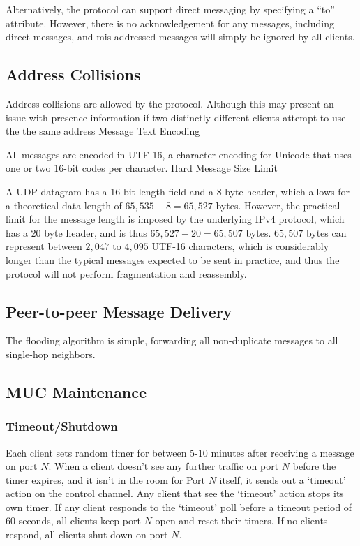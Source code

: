 \documentclass{article}
\begin{document}
Alternatively, the protocol can support direct messaging by specifying a ``to''
attribute. However, there is no acknowledgement for any messages, including
direct messages, and mis-addressed messages will simply be ignored by all
clients.

\subsection{Address Collisions}
Address collisions are allowed by the protocol. Although this may present an
issue with presence information if two distinctly different clients attempt to
use the the same address
Message Text Encoding

All messages are encoded in UTF-16, a character encoding for Unicode that uses
one or two 16-bit codes per character.
Hard Message Size Limit

A UDP datagram has a 16-bit length field and a 8 byte header, which allows for a
theoretical data length of $65,535 - 8 = 65,527$ bytes. However, the practical
limit for the message length is imposed by the underlying IPv4 protocol, which
has a 20 byte header, and is thus $65,527 - 20 = 65,507$ bytes. $65,507$ bytes can
represent between $2,047$ to $4,095$ UTF-16 characters, which is considerably longer
than the typical messages expected to be sent in practice, and thus the
protocol will not perform fragmentation and reassembly.

\subsection{Peer-to-peer Message Delivery}

The flooding algorithm is simple, forwarding all non-duplicate messages to all
single-hop neighbors.

\subsection{MUC Maintenance}

\subsubsection{Timeout/Shutdown}

Each client sets random timer for between 5-10 minutes after receiving a message
on port $N$. When a client doesn't see any further traffic on port $N$ before the
timer expires, and it isn't in the room for Port $N$ itself, it sends out a
`timeout' action on the control channel. Any client that see the `timeout'
action stops its own timer. If any client responds to the `timeout' poll before
a timeout period of 60 seconds, all clients keep port $N$ open and reset their
timers. If no clients
respond, all clients shut down on port $N$.
\end{document}
